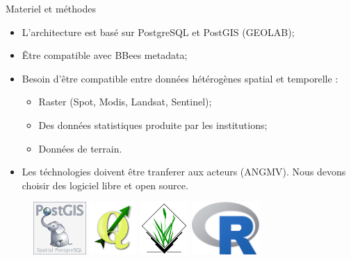 \documentclass[newPxFont]{beamer}
\begin{document}
\begin{frame}[c]{Materiel et méthodes}
\vspace{-1cm}
\begin{itemize}
	\item L'architecture est basé sur PostgreSQL et PostGIS (GEOLAB);
	\item \^Etre compatible avec BBees metadata;
	\item Besoin d'être compatible entre données hétérogènes spatial et temporelle :
	\begin{itemize}
		\item Raster (Spot, Modis, Landsat, Sentinel);
		\item Des données statistiques produite par les institutions;
		\item Données de terrain.
	\end{itemize}
	\item Les téchnologies doivent être tranferer aux acteurs (ANGMV). Nous devons choisir des logiciel libre et open source.
\end{itemize}
\begin{figure}
	\centering
	\includegraphics[height=20mm]{img/PostGIS_logo}
	\includegraphics[height=20mm]{img/QGis_Logo}
	\includegraphics[height=20mm]{img/GrassGIS_banner}
	\includegraphics[height=20mm]{img/Rlogo}
\end{figure}
\end{frame}
\end{document}
